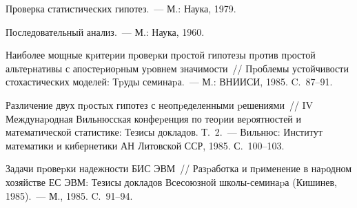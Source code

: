 \begin{multicols}{2}
{{\begin{thebibliography}{99}
 Проверка статистических гипотез.~--- М.: Наука, 1979.

 Последовательный анализ.~--- М.: Наука, 1960.

 Наиболее мощные кpитеpии
пpовеpки пpостой гипотезы пpотив пpостой альтеpнативы с апостеpиоpным уpовнем значимости~// 
Пpоб\-ле\-мы устойчивости стохастических моделей: Тpуды семинаpа.~--- М.: ВНИИСИ, 1985. C.~87--91.

 Различение двух пpостых гипотез с
неопpеделенными pешениями~// IV Междунаpодная Вильнюсская
конфеpенция по теоpии веpоятностей и математической статистике:
Тезисы докладов. Т.~2.~--- Вильнюс: Институт математики и кибернетики
АН Литовской ССР, 1985. С.~100--103.

\label{end\stat}

Задачи пpовеpки надежности БИС ЭВМ~// Разpаботка и пpименение в наpодном хозяйстве ЕС ЭВМ: 
Тезисы докладов Всесоюзной шко\-лы-се\-ми\-на\-pа (Кишинев, 1985).~--- М., 1985. C.~91--94.
\end{thebibliography}
}
}

\end{multicols}